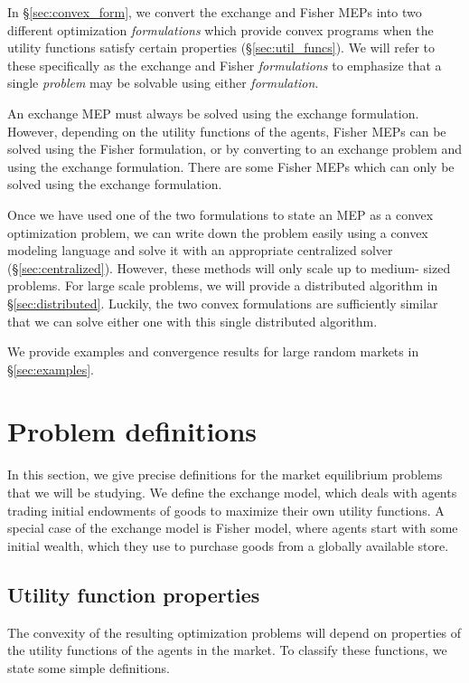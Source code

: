 \documentclass[12pt]{article}
\begin{document}
In \S\ref{sec:convex_form}, we convert the exchange and Fisher MEPs into two
different optimization \emph{formulations} which provide convex programs when
the utility functions satisfy certain properties (\S\ref{sec:util_funcs}). We
will refer to these specifically as the exchange and Fisher \emph{formulations}
to emphasize that a single \emph{problem} may be solvable using either
\emph{formulation}.

An exchange MEP must always be solved using the exchange formulation. However,
depending on the utility functions of the agents, Fisher MEPs can be solved
using the Fisher formulation, or by converting to an exchange problem and using
the exchange formulation. There are some Fisher MEPs which can only be solved
using the exchange formulation.

Once we have used one of the two formulations to state an MEP as a convex
optimization problem, we can write down the problem easily using a convex
modeling language and solve it with an appropriate centralized solver
(\S\ref{sec:centralized}). However, these methods will only scale up to medium-
sized problems. For large scale problems, we will provide a distributed
algorithm in \S\ref{sec:distributed}. Luckily, the two convex formulations are
sufficiently similar that we can solve either one with this single distributed
algorithm.

We provide examples and convergence results for large random markets in
\S\ref{sec:examples}.


\section{Problem definitions}
\label{sec:defs}

In this section, we give precise definitions for the market equilibrium
problems that we will be studying. We define the exchange model, which deals
with agents trading initial endowments of goods to maximize their own utility
functions. A special case of the exchange model is Fisher model, where agents
start with some initial wealth, which they use to purchase goods  from a
globally available store.

\subsection{Utility function properties}

The convexity of the resulting optimization problems will depend on properties
of the utility functions of the agents in the market. To classify these
functions, we state some simple definitions.
\end{document}

